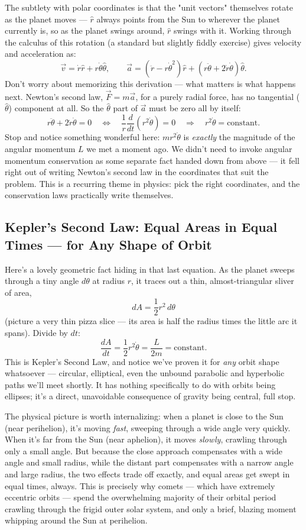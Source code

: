 \documentclass[11pt]{article}
\begin{document}
The subtlety with polar coordinates is that the "unit vectors" themselves rotate as the planet
moves --- $\hat r$ always points from the Sun to wherever the planet currently is, so as the planet
swings around, $\hat r$ swings with it. Working through the calculus of this rotation (a standard
but slightly fiddly exercise) gives velocity and acceleration as:
\[
\vec v = \dot r\hat r + r\dot\theta\hat\theta, \qquad
\vec a = (\ddot r - r\dot\theta^2)\hat r + (r\ddot\theta+2\dot r\dot\theta)\hat\theta.
\]
Don't worry about memorizing this derivation --- what matters is what happens next. Newton's
second law, $\vec F=m\vec a$, for a purely radial force, has no tangential ($\hat\theta$)
component at all. So the $\hat\theta$ part of $\vec a$ must be zero all by itself:
\[
r\ddot\theta + 2\dot r\dot\theta = 0 \quad\Longleftrightarrow\quad \frac{1}{r}\frac{d}{dt}(r^2\dot\theta) = 0
\quad\Longrightarrow\quad r^2\dot\theta = \text{constant}.
\]
Stop and notice something wonderful here: $mr^2\dot\theta$ is \emph{exactly} the magnitude of the
angular momentum $L$ we met a moment ago. We didn't need to invoke angular momentum conservation
as some separate fact handed down from above --- it fell right out of writing Newton's second law
in the coordinates that suit the problem. This is a recurring theme in physics: pick the right
coordinates, and the conservation laws practically write themselves.

\subsection{Kepler's Second Law: Equal Areas in Equal Times --- for Any Shape of Orbit}

Here's a lovely geometric fact hiding in that last equation. As the planet sweeps through a tiny
angle $d\theta$ at radius $r$, it traces out a thin, almost-triangular sliver of area,
\[
dA = \frac12 r^2\,d\theta
\]
(picture a very thin pizza slice --- its area is half the radius times the little arc it spans).
Divide by $dt$:
\[
\boxed{\frac{dA}{dt} = \frac12 r^2\dot\theta = \frac{L}{2m} = \text{constant}.}
\]
This is Kepler's Second Law, and notice we've proven it for \emph{any} orbit shape whatsoever ---
circular, elliptical, even the unbound parabolic and hyperbolic paths we'll meet shortly. It has
nothing specifically to do with orbits being ellipses; it's a direct, unavoidable consequence of
gravity being central, full stop.

The physical picture is worth internalizing: when a planet is close to the Sun (near perihelion),
it's moving \emph{fast}, sweeping through a wide angle very quickly. When it's far from the Sun
(near aphelion), it moves \emph{slowly}, crawling through only a small angle. But because the
close approach compensates with a wide angle and small radius, while the distant part compensates
with a narrow angle and large radius, the two effects trade off exactly, and equal areas get swept
in equal times, always. This is precisely why comets --- which have extremely eccentric orbits ---
spend the overwhelming majority of their orbital period crawling through the frigid outer solar
system, and only a brief, blazing moment whipping around the Sun at perihelion.
\end{document}
